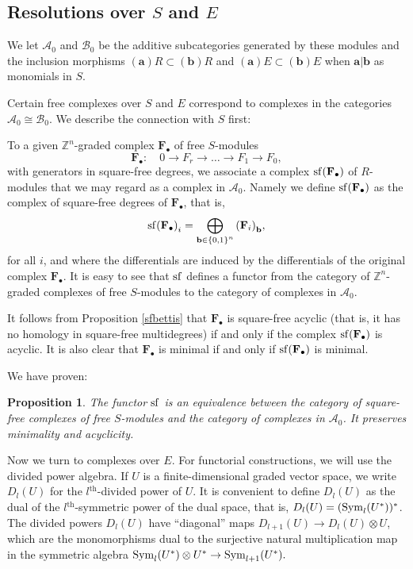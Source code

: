 \documentclass{tran-l}
\newtheorem{proposition}[theorem]{Proposition}
\theoremstyle{definition}
\theoremstyle{remark}
\newcommand{\thh}{{^{\mathrm {th}}}}
\newcommand{\Z}{{\mathbb{Z}}}
\newcommand{\Acal}{{{\mathcal A}}}
\newcommand{\baa}{{\mathbf{a}}}
\newcommand{\bb}{{\mathbf{b}}}
\newcommand{\set}[1]{{\{#1\}}}
\newcommand{\rsf}{\mathop{\rm sf}\nolimits}
\newcommand{\B}{{\mathcal B}}
\newcommand{\Sym}{\mathop{\rm Sym}\nolimits}
\begin{document}
\subsection*{Resolutions over $S$ and $E$}
We let $\Acal_0$ and $\B_0$ be the
additive subcategories generated by these modules and the inclusion
morphisms $(\baa)R\subset(\bb)R$ and $(\baa)E\subset(\bb)E$ when
$\baa|\bb$ as monomials in $S$.

Certain free complexes over $S$ and $E$ correspond to complexes 
in the categories $\Acal_0\cong\B_0$. We describe the connection
with $S$ first:

To a given $\Z^n$-graded complex ${\mathbf F}_\bullet$ of free $S$-modules
\[
{\mathbf F}_\bullet: \quad 0  \to F_r 
\to \ldots \to F_1 \to  F_0, 
\] 
with generators in square-free degrees,
we associate a complex $\rsf({\mathbf F}_\bullet)$ of
$R$-modules that we may regard as a complex in $\Acal_0$. Namely
we define $\rsf({\mathbf F}_\bullet)$ as the complex of
square-free degrees of ${\mathbf F}_\bullet$, that is,
\[
{\rsf({\mathbf F}_\bullet)}_i=
\bigoplus_{\bb\in\set{0,1}^n}{({\mathbf F}_i)}_\bb,
\]
for all $i$, and where the differentials are induced by the
differentials of the original complex ${\mathbf F}_\bullet$.
It is easy to see that $\rsf$ 
defines a functor from the category of $\Z^n$-graded complexes
of free $S$-modules to the category of complexes in $\Acal_0$.

It follows from Proposition \ref{sfbettis}
that ${\mathbf F}_\bullet$ is square-free acyclic (that is, it has
no homology in square-free multidegrees) if and only if the complex
$\rsf({\mathbf F}_\bullet)$ is acyclic. It is also clear that
${\mathbf F}_\bullet$ is minimal if and only if
$\rsf({\mathbf F}_\bullet)$ is minimal.

We have proven:

\begin{proposition}\label{StoA} The functor $\rsf$ is an equivalence between the category
of square-free complexes of free $S$-modules and the category of
complexes in $\Acal_0$. It preserves minimality and acyclicity.\end{proposition}

Now we turn to complexes over $E$. For functorial constructions,
we will use the divided power algebra.
If $U$ is a finite-dimensional graded vector space, we write 
$D_l(U)$ for the $l\thh$-divided power of $U$.  It is convenient to define
$D_l(U)$ as the dual of the $l\thh$-symmetric power of the dual space,
that is, $D_l(U) = (\Sym_l(U^*))^*$.  The divided powers $D_l(U)$ have
``diagonal'' maps 
$D_{l+1}(U) \to D_l(U)\otimes U$,
which are the monomorphisms dual to the surjective 
natural multiplication map in the symmetric algebra
$\Sym_l (U^*)\otimes U^* \to \Sym_{l+1} (U^*).$ 
\end{document}
